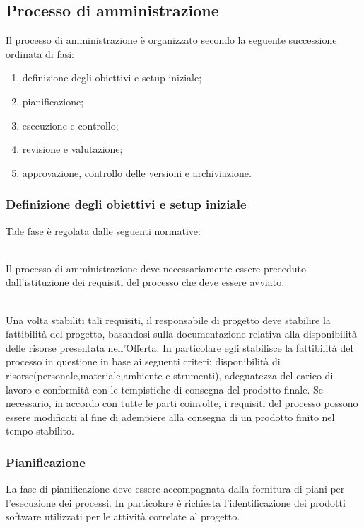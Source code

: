 \subsection{Processo di amministrazione}
Il processo di amministrazione è organizzato secondo la seguente successione ordinata di fasi:

\begin{enumerate}
    \item definizione degli obiettivi e setup iniziale;
    \item pianificazione;
    \item esecuzione e controllo;
    \item revisione e valutazione;
    \item approvazione, controllo delle versioni e archiviazione.
\end{enumerate}

\subsubsection{Definizione degli obiettivi e setup iniziale}
Tale fase è regolata dalle seguenti normative: 

\leavevmode \\ Il processo di amministrazione deve necessariamente essere preceduto dall'istituzione dei requisiti del processo che deve essere avviato.

\leavevmode \\ Una volta stabiliti tali requisiti, il responsabile di progetto deve stabilire la fattibilità del progetto, basandosi sulla documentazione relativa alla disponibilità delle risorse presentata nell'Offerta. In particolare egli stabilisce la fattibilità del processo in questione in base ai seguenti criteri: disponibilità di risorse(personale,materiale,ambiente e strumenti), adeguatezza del carico di lavoro e conformità con le tempistiche di consegna del prodotto finale.
Se necessario, in accordo con tutte le parti coinvolte, i requisiti del processo possono essere modificati al fine di adempiere alla consegna di un prodotto finito nel tempo stabilito. 

\subsubsection{Pianificazione}
La fase di pianificazione deve essere accompagnata dalla fornitura di piani per l'esecuzione dei processi. In particolare è richiesta l'identificazione dei prodotti software utilizzati per le attività correlate al progetto. 

